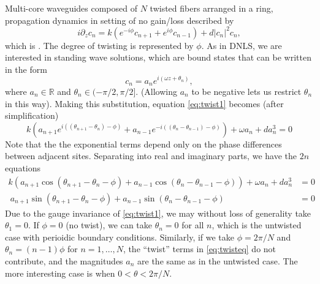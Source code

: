 \documentclass[12pt]{article}
\def\R{{\mathbb R}}
\begin{document}
Multi-core waveguides composed of $N$ twisted fibers arranged in a ring, propagation dynamics in setting of no gain/loss described by 
\begin{equation}\label{eq:twist1}
i \partial_z c_n = k \left(e^{-i\phi}c_{n+1} + e^{i\phi}c_{n-1}\right) + d |c_n|^2 c_n,
\end{equation}
which is \cite[(2.1)]{castro2016}. The degree of twisting is represented by $\phi$. As in DNLS, we are interested in standing wave solutions, which are bound states that can be written in the form
\begin{equation}\label{eq:ansatz1}
c_n = a_n e^{i (\omega z + \theta_n) },
\end{equation}
where $a_n \in \R$ and $\theta_n \in (-\pi/2, \pi/2]$. (Allowing $a_n$ to be negative lets us restrict $\theta_n$ in this way). Making this substitution, equation \cref{eq:twist1} becomes (after simplification)
\begin{equation}\label{eq:twisteq}
k\left( a_{n+1} e^{i((\theta_{n+1}-\theta_n)-\phi)} + a_{n-1} e^{-i((\theta_n - \theta_{n-1})-\phi)}\right) + \omega a_n + d a_n^3 = 0
\end{equation}
Note that the the exponential terms depend only on the phase differences between adjacent sites. Separating into real and imaginary parts, we have the $2n$ equations
\begin{equation}\label{eq:twisteqreal}
\begin{aligned}
k\left( a_{n+1} \cos(\theta_{n+1}-\theta_n-\phi) + a_{n-1} \cos(\theta_n - \theta_{n-1}-\phi)\right) + \omega a_n + d a_n^3 &= 0 \\\
a_{n+1} \sin(\theta_{n+1}-\theta_n-\phi) + a_{n-1} \sin(\theta_n - \theta_{n-1}-\phi) &= 0
\end{aligned}
\end{equation}
Due to the gauge invariance of \cref{eq:twist1}, we may without loss of generality take $\theta_1 = 0$. If $\phi = 0$ (no twist), we can take $\theta_n = 0$ for all $n$, which is the untwisted case with perioidic boundary conditions. Similarly, if we take $\phi = 2 \pi/N$ and $\theta_n = (n-1)\phi$ for $n = 1, \dots, N$, the ``twist'' terms in \cref{eq:twisteq} do not contribute, and the magnitudes $a_n$ are the same as in the untwisted case. The more interesting case is when $0 < \theta < 2 \pi/N$.
\end{document}

